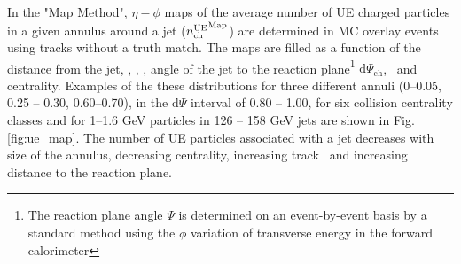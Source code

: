 In the "Map Method", $\eta-\phi$ maps of the average number of UE charged particles in a given annulus around a jet ($\mbox{$n_{\mathrm{ch}}^{\mathrm{UE}}$}^{\mathrm{Map}}$) are determined in MC overlay events using tracks without a truth match. The maps are filled as a function of the distance from the jet, \ptjet, \etajet, \phijet, angle of the jet to the reaction plane\footnote{The reaction plane angle $\Psi$ is determined on an event-by-event basis by a standard method using the $\phi$ variation of transverse energy in the forward calorimeter} $ \mathrm{d}\Psi_{\mathrm{ch}}$, \pt\ and centrality.
Examples of the these distributions for three different annuli (0--0.05, 0.25 -- 0.30, 0.60--0.70), in the $\mathrm{d}\Psi$ interval of  0.80 -- 1.00, for six collision centrality classes and for 1--1.6 GeV particles in 126 -- 158 GeV jets are shown in Fig.\ref{fig:ue_map}. The number of UE particles associated with a jet decreases with size of the annulus, decreasing centrality, increasing track \pT\ and increasing distance to the reaction plane. 
